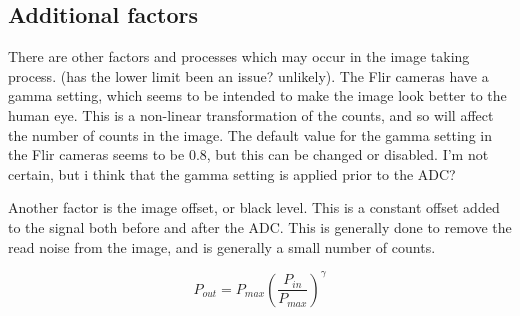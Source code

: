 \documentclass[../../main.tex]{subfiles} %
\begin{document}
\subsection{Additional factors}
There are other factors and processes which may occur in the image taking process. (has the lower limit been an issue? unlikely). The Flir cameras have a gamma setting, which seems to be intended to make the image look better to the human eye. This is a non-linear transformation of the counts, and so will affect the number of counts in the image. The default value for the gamma setting in the Flir cameras seems to be 0.8, but this can be changed or disabled. I'm not certain, but i think that the gamma setting is applied prior to the ADC?

Another factor is the image offset, or black level. This is a constant offset added to the signal both before and after the ADC. This is generally done to remove the read noise from the image, and is generally a small number of counts.

\begin{equation}
    P_{out}=P_{max}\left(\frac{P_{in}}{P_{max}}\right)^\gamma 
\end{equation}
\end{document}
